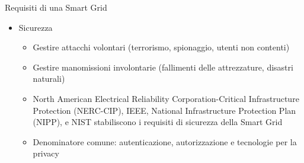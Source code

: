 \begin{frame}{Requisiti di una Smart Grid}
\begin{itemize}[<+- | alert@+>]
\item Sicurezza
	\begin{itemize}
		\item Gestire attacchi volontari (terrorismo, spionaggio, utenti non contenti)
		\item Gestire manomissioni involontarie (fallimenti delle attrezzature, disastri naturali)
		\item North American Electrical Reliability Corporation-Critical Infrastructure Protection (NERC-CIP), IEEE, National Infrastructure Protection Plan (NIPP), e NIST stabiliscono i requisiti di sicurezza della Smart Grid
		\item Denominatore comune: autenticazione, autorizzazione e tecnologie per la privacy
	\end{itemize}
\end{itemize}
\end{frame}